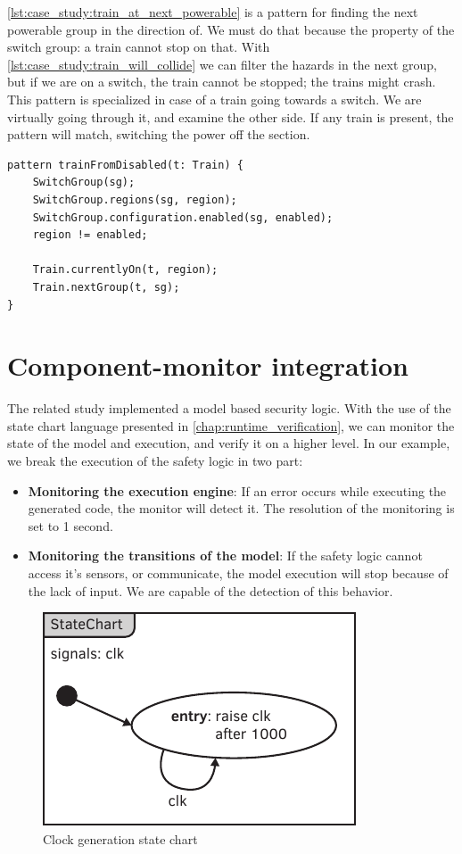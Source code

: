 \newpage
\cref{lst:case_study:train_at_next_powerable} is a pattern for finding the next powerable group in the direction of. We must do that because the property of the switch group: a train cannot stop on that. With \cref{lst:case_study:train_will_collide} we can filter the hazards in the next group, but if we are on a switch, the train cannot be stopped; the trains might crash. This pattern is specialized in case of a train going towards a switch. We are virtually going through it, and examine the other side. If any train is present, the pattern will match, switching the power off the section.
\\[1ex]

\begin{lstlisting}[caption={Collision detection},label=lst:case_study:train_at_next_powerable]
pattern trainFromDisabled(t: Train) {
	SwitchGroup(sg);
	SwitchGroup.regions(sg, region);
	SwitchGroup.configuration.enabled(sg, enabled);
	region != enabled;
	
	Train.currentlyOn(t, region);
	Train.nextGroup(t, sg);
}
\end{lstlisting}

\section{Component-monitor integration}

The related study \citep{tdk2014} implemented a model based security logic. With the use of the state chart language presented in \vref{chap:runtime_verification}, we can monitor the state of the model and execution, and verify it on a higher level. In our example, we break the execution of the safety logic in two part:
\begin{itemize}
	\item \textbf{Monitoring the execution engine}: If an error occurs while executing the generated code, the monitor will detect it. The resolution of the monitoring is set to 1 second.
	\item \textbf{Monitoring the transitions of the model}: If the safety logic cannot access it's sensors, or communicate, the model execution will stop because of the lack of input. We are capable of the detection of this behavior.
\end{itemize}

\begin{figure}[h]
	\centering
	\includegraphics[width=0.3\linewidth]{include/figures/chapter_6/statecharts/clock}
	\caption{Clock generation state chart}
	\label{fig:case_study:clockgen}
\end{figure}


